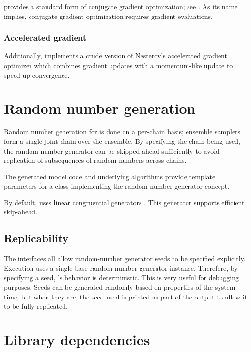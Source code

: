 \documentclass[article]{jss}
\begin{document}
 provides a standard form of conjugate gradient
optimization; see \citep{NocedalWright:2006}.  As its name implies,
conjugate gradient optimization requires gradient evaluations.

\subsubsection{Accelerated gradient}

Additionally,  implements a crude version of Nesterov's
accelerated gradient optimizer \cite{Nesterov:1983} which combines
gradient updates with a momentum-like update to speed up convergence.

\section{Random number generation}\label{rng.section}

Random number generation for  is done on a per-chain
basis; ensemble samplers form a single joint chain over the ensemble.  By
specifying the chain being used, the random number generator can be
skipped ahead sufficiently to avoid replication of subsequences of
random numbers across chains.

The generated model code and underlying  algorithms
provide template parameters for a class implementing the 
random number generator concept.  

By default,  uses linear congruential generators
\citep{LEcuyer:1988}.  This generator supports efficient skip-ahead.

\subsection{Replicability}

The  interfaces all allow random-number generator seeds
to be specified explicitly.  Execution uses a single base random
number generator instance.  Therefore, by specifying a seed,
's behavior is deterministic.  This is very useful for
debugging purposes.  Seeds can be generated randomly based on
properties of the system time, but when they are, the seed used is
printed as part of the output to allow it to be fully replicated.


\section{Library dependencies}
\end{document}
